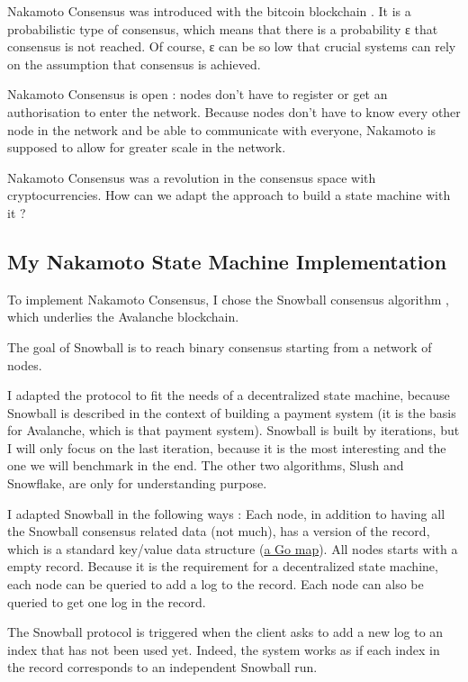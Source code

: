 \documentclass[11pt, twocolumn]{article}
\begin{document}
Nakamoto Consensus was introduced with the bitcoin blockchain \cite{bitcoin}. It is a probabilistic type of consensus, which means that there is a probability ε that consensus is not reached.
Of course, ε can be so low that crucial systems can rely on the assumption that consensus is achieved.

Nakamoto Consensus is open : nodes don't have to register or get an authorisation to enter the network.
Because nodes don't have to know every other node in the network and be able to communicate with everyone, Nakamoto is supposed to allow for greater scale in the network.

Nakamoto Consensus was a revolution in the consensus space with cryptocurrencies. How can we adapt the approach to build a state machine with it ?

\subsection{My Nakamoto State Machine Implementation}

To implement Nakamoto Consensus, I chose the Snowball consensus algorithm \cite{snowprotocol}, which underlies the Avalanche blockchain.

The goal of Snowball is to reach binary consensus starting from a network of nodes.

I adapted the protocol to fit the needs of a decentralized state machine, because Snowball is described in the context of building a payment system (it is the basis for Avalanche, which is that payment system).
Snowball is built by iterations, but I will only focus on the last iteration, because it is the most interesting and the one we will benchmark in the end.
The other two algorithms, Slush and Snowflake, are only for understanding purpose.

I adapted Snowball in the following ways : Each node, in addition to having all the Snowball consensus related data (not much), has a version of the record, which is a standard key/value data structure (\href{https://go.dev/blog/maps}{a Go map}). All nodes starts with a empty record.
Because it is the requirement for a decentralized state machine, each node can be queried to add a log to the record. Each node can also be queried to get one log in the record.

The Snowball protocol is triggered when the client asks to add a new log to an index that has not been used yet. Indeed, the system works as if each index in the record corresponds to an independent Snowball run.
\end{document}
